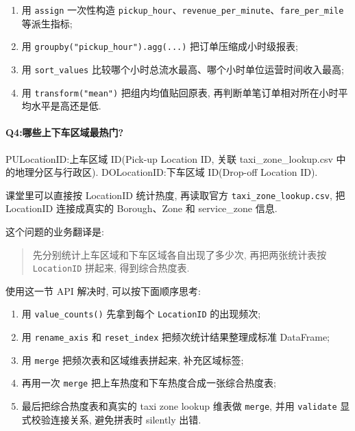 \documentclass[11pt]{article}
\providecommand{\tightlist}{%
      \setlength{\itemsep}{0pt}\setlength{\parskip}{0pt}}
\begin{document}
\begin{enumerate}
\def\labelenumi{\arabic{enumi}.}
\tightlist
\item
  用 \texttt{assign} 一次性构造
  \texttt{pickup\_hour}、\texttt{revenue\_per\_minute}、\texttt{fare\_per\_mile}
  等派生指标;
\item
  用 \texttt{groupby("pickup\_hour").agg(...)} 把订单压缩成小时级报表;
\item
  用 \texttt{sort\_values}
  比较哪个小时总流水最高、哪个小时单位运营时间收入最高;
\item
  用 \texttt{transform("mean")} 把组内均值贴回原表,
  再判断单笔订单相对所在小时平均水平是高还是低.
\end{enumerate}

    \paragraph{Q4:哪些上下车区域最热门?}\label{q4ux54eaux4e9bux4e0aux4e0bux8f66ux533aux57dfux6700ux70edux95e8}

    PULocationID:上车区域 ID(Pick-up Location ID, 关联
taxi\_zone\_lookup.csv 中的地理分区与行政区). DOLocationID:下车区域
ID(Drop-off Location ID).

课堂里可以直接按 LocationID 统计热度, 再读取官方
\texttt{taxi\_zone\_lookup.csv}, 把 LocationID 连接成真实的
Borough、Zone 和 service\_zone 信息.

这个问题的业务翻译是:

\begin{quote}
先分别统计上车区域和下车区域各自出现了多少次, 再把两张统计表按
\texttt{LocationID} 拼起来, 得到综合热度表.
\end{quote}

使用这一节 API 解决时, 可以按下面顺序思考:

\begin{enumerate}
\def\labelenumi{\arabic{enumi}.}
\tightlist
\item
  用 \texttt{value\_counts()} 先拿到每个 \texttt{LocationID} 的出现频次;
\item
  用 \texttt{rename\_axis} 和 \texttt{reset\_index}
  把频次统计结果整理成标准 DataFrame;
\item
  用 \texttt{merge} 把频次表和区域维表拼起来, 补充区域标签;
\item
  再用一次 \texttt{merge} 把上车热度和下车热度合成一张综合热度表;
\item
  最后把综合热度表和真实的 taxi zone lookup 维表做 \texttt{merge}, 并用
  \texttt{validate} 显式校验连接关系, 避免拼表时 silently 出错.
\end{enumerate}
\end{document}
